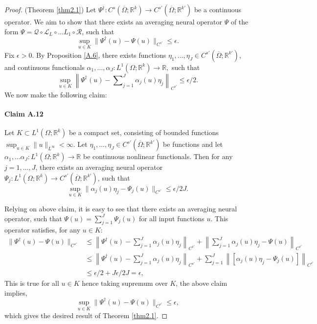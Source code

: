 \documentclass[reqno,9pt]{amsart}
\theoremstyle{plain}
\theoremstyle{definition}
\newcommand{\bb}[1]{\mathbb{#1}}
\newcommand{\cal}[1]{\mathcal{#1}}
\begin{document}
\begin{proof}{(Theorem \ref{thm2.1})}
    Let $\Psi^\dag : C^s(\overline{\Omega};\bb R^k) \to C^{s'}(\overline{\Omega};\bb R^{k'})$ be a continuous operator. We aim to show that there exists an averaging neural operator $\Psi$ of the form $\Psi = \cal Q \circ \cal L_L \circ \dots L_1 \circ \cal R$, such that
    $$ \sup_{u \in K} \|\Psi^\dag(u) - \Psi(u)\|_{C^{s'}} \leq \epsilon.$$
    Fix $\epsilon > 0$. By Proposition \ref{A.6}, there exists functions $\eta_1, \dots, \eta_J \in C^{s'}(\overline{\Omega};\bb R^{k'})$, and continuous functionals $\alpha_1, \dots, \alpha_J : L^1(\Omega; \bb R^k) \to \bb R,$ such that
    $$ \sup_{u \in K}\left\|\Psi^\dag(u) - \sum\nolimits_{j=1}^{J}\alpha_j(u)\eta_j\right\|_{C^{s'}} \leq \epsilon/2.$$
    We now make the following claim:
    \paragraph{\bf Claim A.12 \label{claim1}} Let $K \subset L^1(\Omega; \bb R^k)$ be a compact set, consisting of bounded functions $\sup_{u \in K}\|u\|_{L^\infty} < \infty$. Let $\eta_1, \dots, \eta_J \in C^{s'}(\overline{\Omega};\bb R^{k'})$ be functions and let $\alpha_1, \dots\alpha_J : L^1(\Omega; \bb R^k) \to \bb R$ be continuous nonlinear functionals. Then for any $j = 1, \dots, J$, there exists an averaging neural operator $\Psi_j : L^1(\Omega; \bb R^k) \to C^{s'}(\overline{\Omega};\bb R^{k'})$, such that
    $$\sup_{u\in K}\|\alpha_j(u)\eta_j - \Psi_j(u)\|_{C^{s'}} \leq \epsilon/2J.$$
    
    \noindent Relying on above claim, it is easy to see that there exists an averaging neural operator, such that $\Psi(u) = \sum_{j=1}^{J} \Psi_j(u)$ for all input functions $u$. This operator satisfies, for any $u \in K$:
    $$
    \begin{aligned}
        \|\Psi^\dag(u) - \Psi(u)\|_{C^{s'}} &\leq \left\|\Psi^\dag(u) - \sum\nolimits_{j=1}^{J} \alpha_j(u) \eta_j\right\|_{C^{s'}} + \left\|\sum\nolimits_{j=1}^{J}\alpha_j(u)\eta_j - \Psi(u)\right\|_{C^{s'}}\\
        &\leq \left\|\Psi^\dag(u) - \sum\nolimits_{j=1}^{J} \alpha_j(u) \eta_j\right\|_{C^{s'}} + \sum\nolimits_{j=1}^{J}\left\|[\alpha_j(u)\eta_j - \Psi_j(u)]\right\|_{C^{s'}}\\
        &\leq \epsilon/2 + J\epsilon/2J = \epsilon,
    \end{aligned}
    $$
    This is true for all $u \in K$ hence taking supremum over $K$, the above claim implies,
    $$ \sup_{u \in K} \|\Psi^\dag(u) - \Psi(u)\|_{C^{s'}} \leq \epsilon,$$
    which gives the desired result of Theorem \ref{thm2.1}.


\end{proof}
\end{document}
